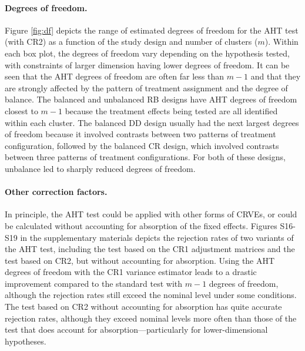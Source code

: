 \documentclass[12pt]{article}\usepackage[]{graphicx}\usepackage[]{color}
\begin{document}
\paragraph{Degrees of freedom.} Figure \ref{fig:df} depicts the range of estimated degrees of freedom for the AHT test (with CR2) as a function of the study design and number of clusters ($m$). 
Within each box plot, the degrees of freedom vary depending on the hypothesis tested, with constraints of larger dimension having lower degrees of freedom. 
It can be seen that the AHT degrees of freedom are often far less than $m - 1$ and that they are strongly affected by the pattern of treatment assignment and the degree of balance. The balanced and unbalanced RB designs have AHT degrees of freedom closest to $m - 1$ because the treatment effects being tested are all identified within each cluster. 
The balanced DD design usually had the next largest degrees of freedom because it involved contrasts between two patterns of treatment configuration, followed by the balanced CR design, which involved contrasts between three patterns of treatment configurations. 
For both of these designs, unbalance led to sharply reduced degrees of freedom.

\paragraph{Other correction factors.} 
In principle, the AHT test could be applied with other forms of CRVEs, or could be calculated without accounting for absorption of the fixed effects. 
Figures S16-S19 in the supplementary materials depicts the rejection rates of two variants of the AHT test, including the test based on the CR1 adjustment matrices and the test based on CR2, but without accounting for absorption. 
Using the AHT degrees of freedom with the CR1 variance estimator leads to a drastic improvement compared to the standard test with $m - 1$ degrees of freedom, although the rejection rates still exceed the nominal level under some conditions.
The test based on CR2 without accounting for absorption has quite accurate rejection rates, although they exceed nominal levels more often than those of the test that does account for absorption---particularly for lower-dimensional hypotheses. 
\end{document}
